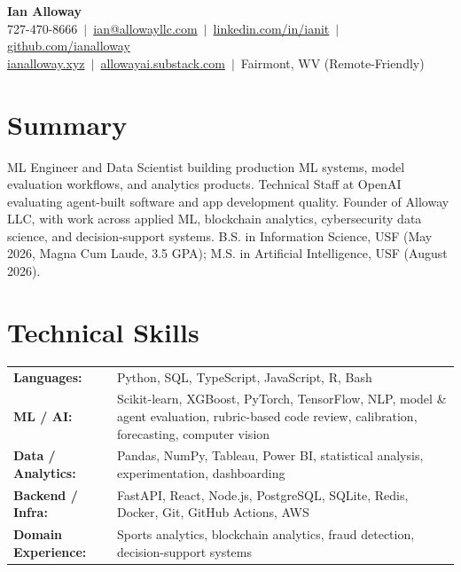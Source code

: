 \documentclass[11pt,letterpaper]{article}
\begin{document}
\begin{center}
    {\LARGE\bfseries Ian Alloway} \\[4pt]
    727-470-8666 \,$\vert$\,
    \href{mailto:ian@allowayllc.com}{ian@allowayllc.com} \,$\vert$\,
    \href{https://linkedin.com/in/ianit}{linkedin.com/in/ianit} \,$\vert$\,
    \href{https://github.com/ianalloway}{github.com/ianalloway} \\[2pt]
    \href{https://ianalloway.xyz}{ianalloway.xyz} \,$\vert$\,
    \href{https://allowayai.substack.com}{allowayai.substack.com} \,$\vert$\,
    Fairmont, WV (Remote-Friendly)
\end{center}

\vspace{-2pt}

\section{Summary}
ML Engineer and Data Scientist building production ML systems, model evaluation workflows, and analytics products. Technical Staff at OpenAI evaluating agent-built software and app development quality. Founder of Alloway LLC, with work across applied ML, blockchain analytics, cybersecurity data science, and decision-support systems. B.S. in Information Science, USF (May 2026, Magna Cum Laude, 3.5 GPA); M.S. in Artificial Intelligence, USF (August 2026).

\section{Technical Skills}
\begin{tabularx}{\textwidth}{@{}l X@{}}
\textbf{Languages:} & Python, SQL, TypeScript, JavaScript, R, Bash \\
\textbf{ML / AI:} & Scikit-learn, XGBoost, PyTorch, TensorFlow, NLP, model \& agent evaluation, rubric-based code review, calibration, forecasting, computer vision \\
\textbf{Data / Analytics:} & Pandas, NumPy, Tableau, Power BI, statistical analysis, experimentation, dashboarding \\
\textbf{Backend / Infra:} & FastAPI, React, Node.js, PostgreSQL, SQLite, Redis, Docker, Git, GitHub Actions, AWS \\
\textbf{Domain Experience:} & Sports analytics, blockchain analytics, fraud detection, decision-support systems \\
\end{tabularx}
\end{document}

